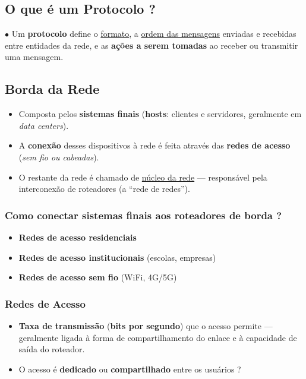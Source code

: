     \subsection{O que é um Protocolo ?}
        $\bullet$ Um \textbf{protocolo} define o \underline{formato}, a \underline{ordem das mensagens} enviadas e recebidas entre entidades da rede, e as \textbf{ações a serem tomadas} ao receber ou transmitir uma mensagem.
    \subsection{Borda da Rede}

    \begin{itemize}[left=0.5cm, align=left, nosep]
        \item Composta pelos \textbf{sistemas finais} (\textbf{hosts}: clientes e servidores, geralmente em \textit{data centers}).
        \item A \textbf{conexão} desses dispositivos à rede é feita através das \textbf{redes de acesso} (\textit{sem fio ou cabeadas}).
        \item O restante da rede é chamado de \underline{núcleo da rede} — responsável pela interconexão de roteadores (a “rede de redes”).
    \end{itemize}

    \subsubsection*{Como conectar sistemas finais aos roteadores de borda ?}
    \begin{itemize}[left=0.5cm, align=left, nosep]
        \item \textbf{Redes de acesso residenciais}
        \item \textbf{Redes de acesso institucionais} (escolas, empresas)
        \item \textbf{Redes de acesso sem fio} (WiFi, 4G/5G)
    \end{itemize}

    \subsubsection*{Redes de Acesso}
    \begin{itemize}[left=0.5cm, align=left, nosep]
        \item \textbf{Taxa de transmissão} (\textbf{bits por segundo}) que o acesso permite — geralmente ligada à forma de compartilhamento do enlace e à capacidade de saída do roteador.
        \item O acesso é \textbf{dedicado} ou \textbf{compartilhado} entre os usuários ?
    \end{itemize}

